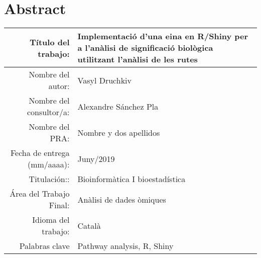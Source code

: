 

\chapter*{Abstract}
\label{cha:abstract}

\begin{table}[]
\begin{tabular}{|r|
>{\columncolor[HTML]{C0C0C0}}l |}
\hline
Título del trabajo:         & Implementació d’una eina en R/Shiny per a l’anàlisi de significació biològica utilitzant l'anàlisi de les rutes \\ \hline
Nombre del autor:           & Vasyl Druchkiv                                                                                                  \\ \hline
Nombre del consultor/a:     & Alexandre Sánchez Pla                                                                                           \\ \hline
Nombre del PRA:             & Nombre y dos apellidos                                                                                          \\ \hline
Fecha de entrega (mm/aaaa): & Juny/2019                                                                                                       \\ \hline
Titulación::                & Bioinformàtica I bioestadística                                                                                 \\ \hline
Área del Trabajo Final:     & Anàlisi de dades òmiques                                                                                        \\ \hline
Idioma del trabajo:         & Català                                                                                                          \\ \hline
Palabras clave              & Pathway analysis, R, Shiny                                                                                      \\ \hline
\end{tabular}
\end{table}


